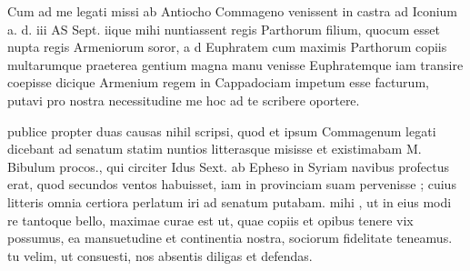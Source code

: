 


 Cum ad me legati missi ab Antiocho Commageno venissent in castra ad Iconium a. d. iii AS Sept. iique mihi nuntiassent regis Parthorum filium, quocum esset nupta regis Armeniorum soror, a d Euphratem cum maximis Parthorum copiis multarumque praeterea gentium magna manu venisse Euphratemque iam transire coepisse dicique Armenium regem in Cappadociam impetum esse facturum, putavi pro nostra necessitudine me hoc ad te scribere oportere.

 publice propter duas causas nihil scripsi, quod et ipsum Commagenum legati dicebant ad senatum statim nuntios litterasque misisse et existimabam M. Bibulum procos., qui circiter Idus Sext. ab Epheso in Syriam navibus profectus erat, quod secundos ventos habuisset, iam in provinciam suam pervenisse ; cuius litteris omnia certiora perlatum iri ad senatum putabam. mihi , ut in eius modi re tantoque bello, maximae curae est ut, quae copiis et opibus tenere vix possumus, ea mansuetudine et continentia nostra, sociorum fidelitate teneamus. tu velim, ut consuesti, nos absentis diligas et defendas.
